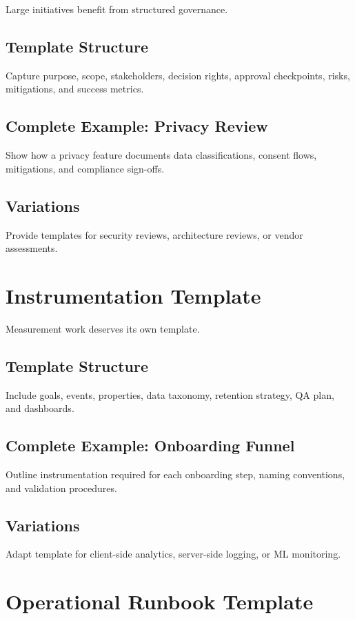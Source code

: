 Large initiatives benefit from structured governance.

\subsection{Template Structure}
Capture purpose, scope, stakeholders, decision rights, approval checkpoints, risks, mitigations, and success metrics.

\subsection{Complete Example: Privacy Review}
Show how a privacy feature documents data classifications, consent flows, mitigations, and compliance sign-offs.

\subsection{Variations}
Provide templates for security reviews, architecture reviews, or vendor assessments.

\section{Instrumentation Template}
\label{sec:instrumentation-template}

Measurement work deserves its own template.

\subsection{Template Structure}
Include goals, events, properties, data taxonomy, retention strategy, QA plan, and dashboards.

\subsection{Complete Example: Onboarding Funnel}
Outline instrumentation required for each onboarding step, naming conventions, and validation procedures.

\subsection{Variations}
Adapt template for client-side analytics, server-side logging, or ML monitoring.

\section{Operational Runbook Template}
\label{sec:runbook-template}

